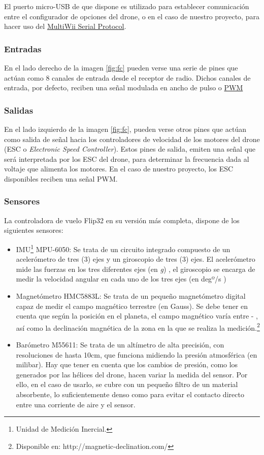 El puerto micro-USB de que dispone es utilizado para establecer comunicación entre el configurador de opciones del drone, o en el caso de nuestro proyecto, para hacer uso del \hyperref[subsec:MSP]{MultiWii Serial Protocol}. 


\subsubsection{Entradas}
En el lado derecho de la imagen \ref{fig:fc} pueden verse una serie de pines que actúan como 8 canales de entrada desde el receptor de radio.
Dichos canales de entrada, por defecto, reciben una señal modulada en ancho de pulso o \hyperref[subsec:PWM]{PWM}

 

\subsubsection{Salidas}
En el lado izquierdo de la imagen \ref{fig:fc}, pueden verse otros pines que actúan como salida de señal hacia los controladores de velocidad de los motores del drone (ESC o \textit{Electronic Speed Controller}).
Estos pines de salida, emiten una señal que será interpretada por los ESC del drone, para determinar la frecuencia dada al voltaje que alimenta los motores. En el caso de nuestro proyecto, los ESC disponibles reciben una señal PWM.

\newpage
\subsubsection{Sensores}
La controladora de vuelo Flip32 en su versión más completa, dispone de los siguientes sensores:
\begin{itemize}
\item IMU\footnote{Unidad de Medición Inercial.} MPU-6050: Se trata de un circuito integrado compuesto de un acelerómetro de tres (3) ejes y un giroscopio de tres (3) ejes. El acelerómetro mide las fuerzas en los tres diferentes ejes (en \textit{g}) , el giroscopio se encarga de medir la velocidad angular en cada uno de los tres ejes (en degº/s )
\item Magnetómetro HMC5883L: Se trata de un pequeño magnetómetro digital capaz de medir el campo magnético terrestre (en Gauss). Se debe tener en cuenta que según la posición en el planeta, el campo magnético varía entre \si{} - \si{}, así como la declinación magnética de la zona en la que se realiza la medición.\footnote{Disponible en: http://magnetic-declination.com/}
\item Barómetro M55611: Se trata de un altímetro de alta precisión, con resoluciones de hasta 10cm, que funciona midiendo la presión atmosférica (en milibar). Hay que tener en cuenta que los cambios de presión, como los generados por las hélices del drone, hacen variar la medida del sensor. Por ello, en el caso de usarlo, se cubre con un pequeño filtro de un material absorbente, lo suficientemente denso como para evitar el contacto directo entre una corriente de aire y el sensor.
\end{itemize}

